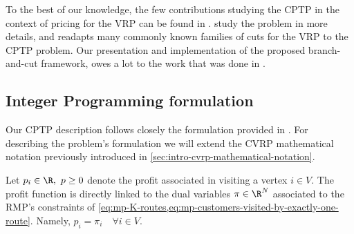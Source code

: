 To the best of our knowledge, the few contributions studying the CPTP
in the context of pricing for the VRP can be found in \textcite{jepsen2008,jepsen2011,jepsen2014}.
\textcite{jepsen2014} study the problem in more details, and readapts many commonly known families
of cuts for the VRP to the CPTP problem.
Our presentation and implementation of the proposed branch-and-cut framework,
owes a lot to the work that was done in \textcite{jepsen2014}.

\subsection{Integer Programming formulation}
\label{sec:cptp-integer-programming-formulation}

Our CPTP description follows closely the formulation provided in \textcite{jepsen2014}.
For describing the problem's formulation we will extend the CVRP mathematical notation
previously introduced in \cref{sec:intro-cvrp-mathematical-notation}.

Let $p_i \in \R,\ p \ge 0$ denote the profit associated in visiting a vertex $i \in V$.
The profit function is directly linked to the dual variables $\pi \in \R^N$ associated to
the RMP's constraints of \cref{eq:mp-K-routes,eq:mp-customers-visited-by-exactly-one-route}.
Namely, $p_i = \pi_i \quad \forall i \in V$.

